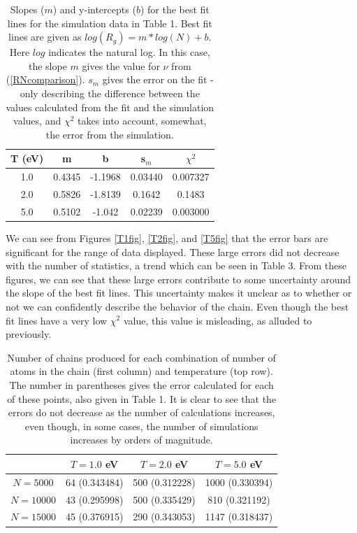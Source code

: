 \documentclass{article}
\begin{document}
\begin{multicols}{2}
\begin{table}
\begin{center}
\begin{tabular}{| c | c | c | c | c |}
\hline \textbf{T (eV)} & \textbf{m} & \textbf{b} & \textbf{s$_m$} & \textbf{$\chi ^2$} \\ \hline
1.0 & 0.4345 & -1.1968 & 0.03440 & 0.007327 \\ \hline
2.0 & 0.5826 & -1.8139 & 0.1642 & 0.1483 \\ \hline
5.0 & 0.5102 & -1.042 & 0.02239 & 0.003000 \\ \hline
\end{tabular}
\caption{Slopes ($m$) and y-intercepts ($b$) for the best fit lines for the simulation data in Table 1.  Best fit lines are given as $log(R_g) = m*log(N) + b$.  Here $log$ indicates the natural log.  In this case, the slope $m$ gives the value for $\nu$ from (\ref{RNcomparison}).  $s_m$ gives the error on the fit - only describing the difference between the values calculated from the fit and the simulation values, and $\chi^2$ takes into account, somewhat, the error from the simulation.}
\end{center}
\end{table}

We can see from Figures \ref{T1fig}, \ref{T2fig}, and \ref{T5fig} that the error bars are significant for the range of data displayed.  These large errors did not decrease with the number of statistics, a trend which can be seen in Table 3.  From these figures, we can see that these large errors contribute to some uncertainty around the slope of the best fit lines.  This uncertainty makes it unclear as to whether or not we can confidently describe the behavior of the chain.  Even though the best fit lines have a very low $\chi ^2$ value, this value is misleading, as alluded to previously.    \\

\begin{table}
\begin{center}
\begin{tabular}{| c | c | c | c |}
\hline & $T=1.0$ eV & $T = 2.0$ eV & $T = 5.0$ eV \\ \hline
$N=5000$ & 64 (0.343484) & 500 (0.312228) & 1000 (0.330394) \\ \hline
$N=10000$ & 43 (0.295998)  & 500 (0.335429) & 810 (0.321192) \\ \hline
$N=15000$ & 45 (0.376915) & 290 (0.343053) & 1147 (0.318437) \\ \hline
\end{tabular}
\caption{Number of chains produced for each combination of number of atoms in the chain (first column) and temperature (top row).  The number in parentheses gives the error calculated for each of these points, also given in Table 1.  It is clear to see that the errors do not decrease as the number of calculations increases, even though, in some cases, the number of simulations increases by orders of magnitude.}
\end{center}
\end{table}


\end{multicols}
\end{document}
